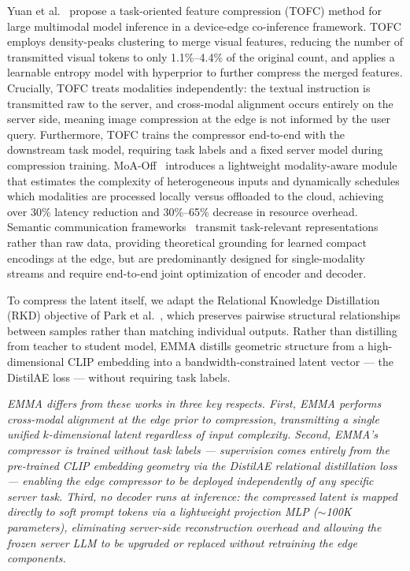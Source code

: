Yuan et al.~\cite{yuan2025task} propose a task-oriented feature compression (TOFC) method
for large multimodal model inference in a device-edge co-inference framework. TOFC employs
density-peaks clustering to merge visual features, reducing the number of transmitted visual
tokens to only 1.1\%--4.4\% of the original count, and applies a learnable entropy model
with hyperprior to further compress the merged features. Crucially, TOFC treats modalities
independently: the textual instruction is transmitted raw to the server, and cross-modal
alignment occurs entirely on the server side, meaning image compression at the edge is not
informed by the user query. Furthermore, TOFC trains the compressor end-to-end with the
downstream task model, requiring task labels and a fixed server model during compression
training. MoA-Off~\cite{yang2025moaoff} introduces a lightweight modality-aware module that
estimates the complexity of heterogeneous inputs and dynamically schedules which modalities
are processed locally versus offloaded to the cloud, achieving over 30\% latency reduction
and 30\%--65\% decrease in resource overhead. Semantic communication
frameworks~\cite{ref19,ref20} transmit task-relevant representations rather than raw data,
providing theoretical grounding for learned compact encodings at the edge, but are
predominantly designed for single-modality streams and require end-to-end joint optimization
of encoder and decoder.

To compress the latent itself, we adapt the Relational Knowledge Distillation (RKD)
objective of Park et al.~\cite{park2019relational}, which preserves pairwise structural
relationships between samples rather than matching individual outputs. Rather than distilling
from teacher to student model, EMMA distills geometric structure from a high-dimensional
CLIP embedding into a bandwidth-constrained latent vector — the DistilAE loss — without
requiring task labels.

{\em EMMA differs from these works in three key respects. First, EMMA performs cross-modal
alignment at the edge prior to compression, transmitting a single unified $k$-dimensional
latent regardless of input complexity. Second, EMMA's compressor is trained without task
labels — supervision comes entirely from the pre-trained CLIP embedding geometry via the
DistilAE relational distillation loss — enabling the edge compressor to be deployed
independently of any specific server task. Third, no decoder runs at inference: the
compressed latent is mapped directly to soft prompt tokens via a lightweight projection MLP
($\sim$100K parameters), eliminating server-side reconstruction overhead and allowing the
frozen server LLM to be upgraded or replaced without retraining the edge components.}
